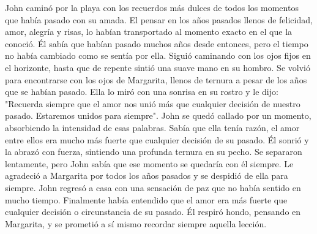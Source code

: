  
John caminó por la playa con los recuerdos más dulces de todos los momentos que había pasado con su amada. El pensar en los años pasados llenos de felicidad, amor, alegría y risas, lo habían transportado al momento exacto en el que la conoció. Él sabía que habían pasado muchos años desde entonces, pero el tiempo no había cambiado como se sentía por ella. 
Siguió caminando con los ojos fijos en el horizonte, hasta que de repente sintió una suave mano en su hombro. Se volvió para encontrarse con los ojos de Margarita, llenos de ternura a pesar de los años que se habían pasado. Ella lo miró con una sonrisa en su rostro y le dijo: 
"Recuerda siempre que el amor nos unió más que cualquier decisión de nuestro pasado. Estaremos unidos para siempre". 
John se quedó callado por un momento, absorbiendo la intensidad de esas palabras. Sabía que ella tenía razón, el amor entre ellos era mucho más fuerte que cualquier decisión de su pasado. Él sonrió y la abrazó con fuerza, sintiendo una profunda ternura en su pecho. 
Se separaron lentamente, pero John sabía que ese momento se quedaría con él siempre. Le agradeció a Margarita por todos los años pasados y se despidió de ella para siempre. 
John regresó a casa con una sensación de paz que no había sentido en mucho tiempo. Finalmente había entendido que el amor era más fuerte que cualquier decisión o circunstancia de su pasado. Él respiró hondo, pensando en Margarita, y se prometió a sí mismo recordar siempre aquella lección.
